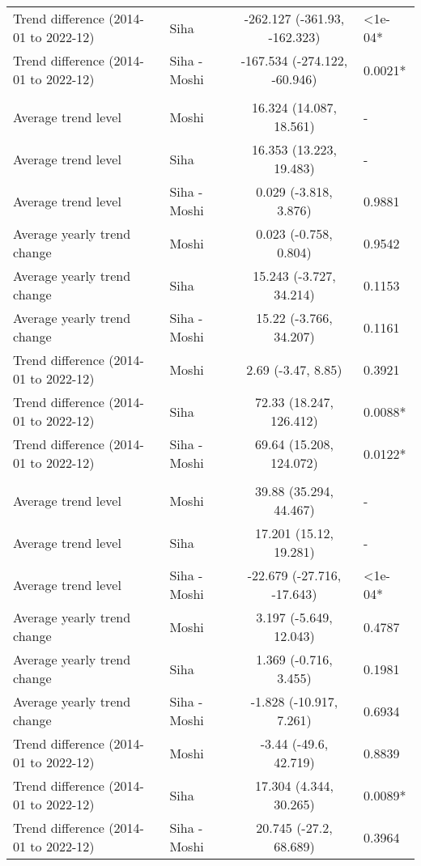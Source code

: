 \begin{longtable}{l|lcl}
Trend difference (2014-01 to 2022-12) & Siha & -262.127 (-361.93, -162.323) & <1e-04* \\ 
Trend difference (2014-01 to 2022-12) & Siha - Moshi & -167.534 (-274.122, -60.946) & 0.0021* \\ 
\midrule\addlinespace[2.5pt]
\multicolumn{4}{l}{Neoplasms/Cancer} \\ 
\midrule\addlinespace[2.5pt]
Average trend level & Moshi & 16.324 (14.087, 18.561) & - \\ 
Average trend level & Siha & 16.353 (13.223, 19.483) & - \\ 
Average trend level & Siha - Moshi & 0.029 (-3.818, 3.876) & 0.9881 \\ 
Average yearly trend change & Moshi & 0.023 (-0.758, 0.804) & 0.9542 \\ 
Average yearly trend change & Siha & 15.243 (-3.727, 34.214) & 0.1153 \\ 
Average yearly trend change & Siha - Moshi & 15.22 (-3.766, 34.207) & 0.1161 \\ 
Trend difference (2014-01 to 2022-12) & Moshi & 2.69 (-3.47, 8.85) & 0.3921 \\ 
Trend difference (2014-01 to 2022-12) & Siha & 72.33 (18.247, 126.412) & 0.0088* \\ 
Trend difference (2014-01 to 2022-12) & Siha - Moshi & 69.64 (15.208, 124.072) & 0.0122* \\ 
\midrule\addlinespace[2.5pt]
\multicolumn{4}{l}{Neuroses} \\ 
\midrule\addlinespace[2.5pt]
Average trend level & Moshi & 39.88 (35.294, 44.467) & - \\ 
Average trend level & Siha & 17.201 (15.12, 19.281) & - \\ 
Average trend level & Siha - Moshi & -22.679 (-27.716, -17.643) & <1e-04* \\ 
Average yearly trend change & Moshi & 3.197 (-5.649, 12.043) & 0.4787 \\ 
Average yearly trend change & Siha & 1.369 (-0.716, 3.455) & 0.1981 \\ 
Average yearly trend change & Siha - Moshi & -1.828 (-10.917, 7.261) & 0.6934 \\ 
Trend difference (2014-01 to 2022-12) & Moshi & -3.44 (-49.6, 42.719) & 0.8839 \\ 
Trend difference (2014-01 to 2022-12) & Siha & 17.304 (4.344, 30.265) & 0.0089* \\ 
Trend difference (2014-01 to 2022-12) & Siha - Moshi & 20.745 (-27.2, 68.689) & 0.3964 \\ 

\end{longtable}
